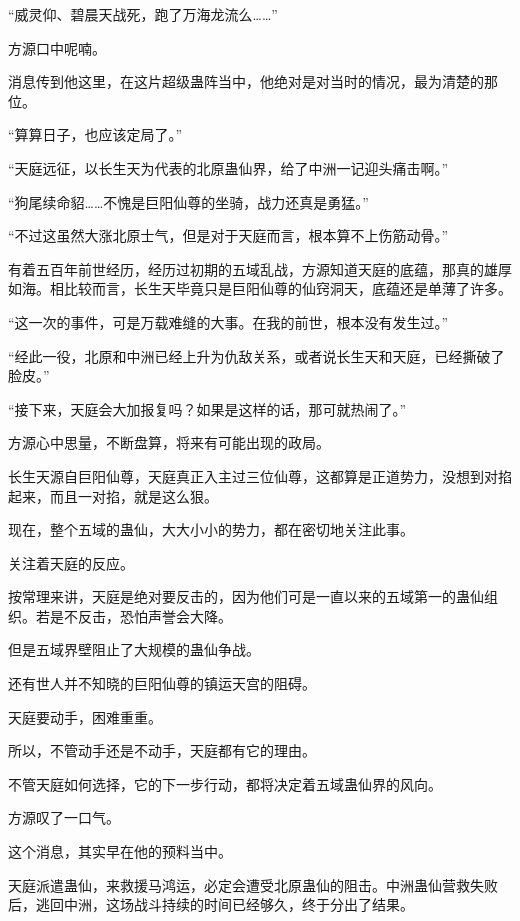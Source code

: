 
\begin{this_body}



“威灵仰、碧晨天战死，跑了万海龙流么……”

方源口中呢喃。

消息传到他这里，在这片超级蛊阵当中，他绝对是对当时的情况，最为清楚的那位。

“算算日子，也应该定局了。”

“天庭远征，以长生天为代表的北原蛊仙界，给了中洲一记迎头痛击啊。”

“狗尾续命貂……不愧是巨阳仙尊的坐骑，战力还真是勇猛。”

“不过这虽然大涨北原士气，但是对于天庭而言，根本算不上伤筋动骨。”

有着五百年前世经历，经历过初期的五域乱战，方源知道天庭的底蕴，那真的雄厚如海。相比较而言，长生天毕竟只是巨阳仙尊的仙窍洞天，底蕴还是单薄了许多。

“这一次的事件，可是万载难缝的大事。在我的前世，根本没有发生过。”

“经此一役，北原和中洲已经上升为仇敌关系，或者说长生天和天庭，已经撕破了脸皮。”

“接下来，天庭会大加报复吗？如果是这样的话，那可就热闹了。”

方源心中思量，不断盘算，将来有可能出现的政局。

长生天源自巨阳仙尊，天庭真正入主过三位仙尊，这都算是正道势力，没想到对掐起来，而且一对掐，就是这么狠。

现在，整个五域的蛊仙，大大小小的势力，都在密切地关注此事。

关注着天庭的反应。

按常理来讲，天庭是绝对要反击的，因为他们可是一直以来的五域第一的蛊仙组织。若是不反击，恐怕声誉会大降。

但是五域界壁阻止了大规模的蛊仙争战。

还有世人并不知晓的巨阳仙尊的镇运天宫的阻碍。

天庭要动手，困难重重。

所以，不管动手还是不动手，天庭都有它的理由。

不管天庭如何选择，它的下一步行动，都将决定着五域蛊仙界的风向。

方源叹了一口气。

这个消息，其实早在他的预料当中。

天庭派遣蛊仙，来救援马鸿运，必定会遭受北原蛊仙的阻击。中洲蛊仙营救失败后，逃回中洲，这场战斗持续的时间已经够久，终于分出了结果。


\end{this_body}

